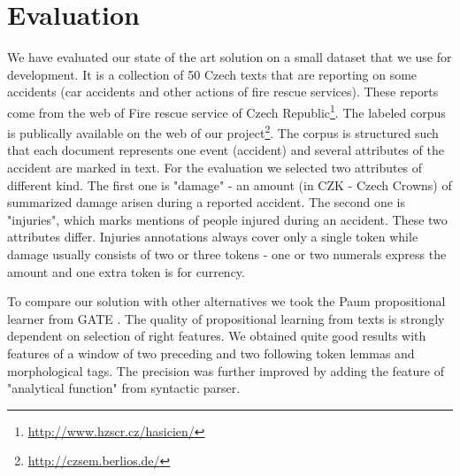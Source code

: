 \documentclass[runningheads,a4paper]{llncs}
\begin{document}
\section{Evaluation}
\label{sec:evaluation}

We have evaluated our state of the art solution on a small dataset that we use for development. It is a collection of 50 Czech texts that are reporting on some accidents (car accidents and other actions of fire rescue services). These reports come from the web of Fire rescue service of Czech Republic\footnote{\url{http://www.hzscr.cz/hasicien/}}. The labeled corpus is publically available on the web of our project\footnote{\url{http://czsem.berlios.de/}}.
The corpus is structured such that each document represents one event (accident) and several attributes of the accident are marked in text. For the evaluation we selected two attributes of different kind. The first one is "damage" - an amount (in CZK - Czech Crowns) of summarized damage arisen during a reported accident. The second one is "injuries", which marks mentions of people injured during an accident. These two attributes differ. Injuries annotations always cover only a single token while damage usually consists of two or three tokens - one or two numerals express the amount and one extra token is for currency.


To compare our solution with other alternatives we took the Paum propositional learner from GATE \cite{Li:Paum}. The quality of propositional learning from texts is strongly dependent on selection of right features. We obtained quite good results with features of a window of two preceding and two following token lemmas and morphological tags. The precision was further improved by adding the feature of "analytical function" from syntactic parser.
\end{document}
